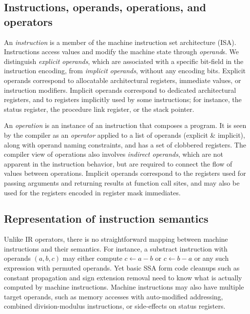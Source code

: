 \subsection{Instructions, operands, operations, and operators}

An \emph{instruction} is a member of the machine instruction set architecture
(ISA). Instructions access values and modify the machine state through
\emph{operand}s. We distinguish \emph{explicit operands}, which are associated
with a specific bit-field in the instruction encoding, from \emph{implicit
operands}, without any encoding bits.  Explicit operands correspond to
allocatable architectural registers, immediate values, or instruction modifiers.
Implicit operands correspond to dedicated architectural registers,
and to registers implicitly used by some instructions; for instance, the
status register, the procedure link register, or the stack pointer.

An \emph{operation} is an instance of an instruction that composes a program. It
is seen by the compiler as an \emph{operator} applied to a list of operands
(explicit \& implicit), along with operand naming constraints, and has a set of
clobbered registers. The compiler view of operations also involves
\emph{indirect operands}, which are not apparent in the instruction behavior,
but are required to connect the flow of values between operations.  Implicit
operands correspond to the registers used for passing arguments and returning
results at function call sites, and may also be used for the registers
encoded in register mask immediates.


\subsection{Representation of instruction semantics}

Unlike IR operators, there is no straightforward mapping between machine
instructions and their semantics. For instance, a substract instruction with
operands $(a,b,c)$ may either compute $c \leftarrow a-b$ or $c \leftarrow b-a$
or any such expression with permuted operands. Yet basic SSA form code cleanups
such as constant propagation and sign extension removal need to know what is
actually computed by machine instructions. Machine instructions may also have
multiple target operands, such as memory accesses with auto-modified addressing,
combined division-modulus instructions, or side-effects on status registers.

